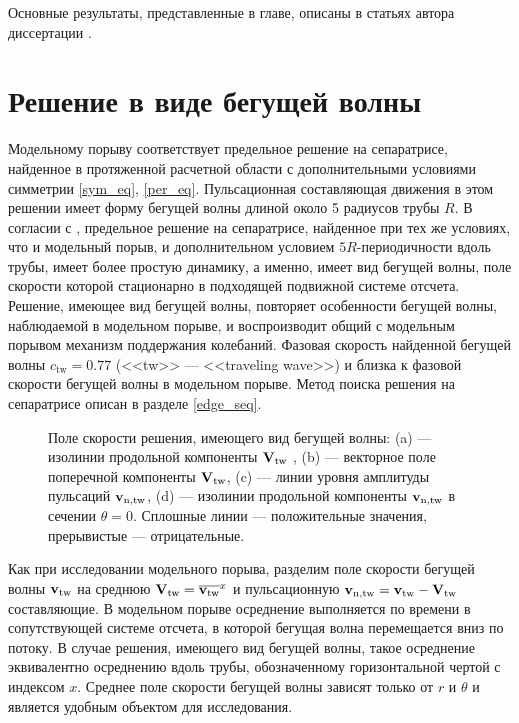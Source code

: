 Основные результаты, представленные в главе, описаны в статьях автора диссертации \cite{MZG2017, KMU17}. 



\section{Решение в виде бегущей волны} \label{pipe_tw_seq}

Модельному порыву соответствует предельное решение на сепаратрисе, найденное в протяженной расчетной области с дополнительными условиями симметрии \eqref{sym_eq}, \eqref{per_eq}. Пульсационная составляющая движения в этом решении имеет форму бегущей волны длиной около 5 радиусов трубы $R$. В согласии с \cite{Avila2013}, предельное решение на сепаратрисе, найденное при тех же условиях, что и модельный порыв, и дополнительном условием $5R$-периодичности вдоль трубы, имеет более простую динамику, а именно, имеет вид бегущей волны, поле скорости которой стационарно в подходящей подвижной системе отсчета. Решение, имеющее вид бегущей волны, повторяет особенности бегущей волны, наблюдаемой в модельном порыве, и воспроизводит общий с модельным порывом механизм поддержания колебаний. Фазовая скорость найденной бегущей волны $c_\mathrm{tw} = 0.77$ (<<tw>> --- <<traveling wave>>) и близка к фазовой скорости бегущей волны в модельном порыве. Метод поиска решения на сепаратрисе описан в разделе \ref{edge_seq}. 

\begin{figure}
\caption{Поле скорости решения, имеющего вид бегущей волны: (a) --- изолинии продольной компоненты $\mathbf{V}_\mathrm{tw}$ , (b) --- векторное поле поперечной компоненты $\mathbf{V}_\mathrm{tw}$, (c) --- линии уровня амплитуды пульсаций $\mathbf{v}_\mathrm{n,tw}$, (d) --- изолинии продольной компоненты $\mathbf{v}_\mathrm{n,tw}$ в сечении $\theta = 0$. Сплошные линии --- положительные значения, прерывистые --- отрицательные.}
\label{pipetw_pic}
\end{figure}

Как при исследовании модельного порыва, разделим поле скорости бегущей волны $\mathbf{v}_\mathrm{tw}$ на среднюю $\mathbf{V}_\mathrm{tw} = \overline{\mathbf{v}_\mathrm{tw}}^{x}$ и пульсационную $\mathbf{v}_\mathrm{n,tw} = \mathbf{v}_\mathrm{tw} - \mathbf{V}_\mathrm{tw}$ составляющие. В модельном порыве осреднение выполняется по времени в сопутствующей системе отсчета, в которой бегущая волна перемещается вниз по потоку. В случае решения, имеющего вид бегущей волны, такое осреднение эквивалентно осреднению вдоль трубы, обозначенному горизонтальной чертой с индексом $x$. Среднее поле скорости бегущей волны зависят только от $r$ и $\theta$ и является удобным объектом для исследования. 

